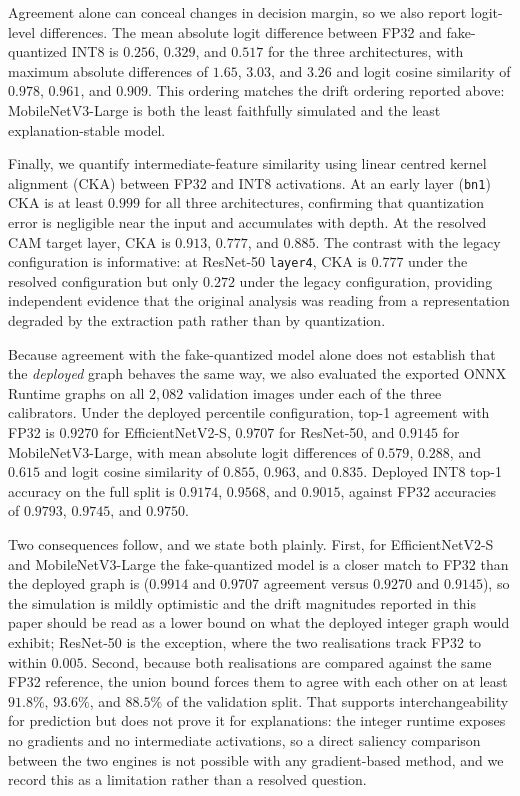 \documentclass[fleqn,10pt]{wlscirep}
\begin{document}
Agreement alone can conceal changes in decision margin, so we also report logit-level differences. The mean absolute logit difference between FP32 and fake-quantized INT8 is $0.256$, $0.329$, and $0.517$ for the three architectures, with maximum absolute differences of $1.65$, $3.03$, and $3.26$ and logit cosine similarity of $0.978$, $0.961$, and $0.909$. This ordering matches the drift ordering reported above: MobileNetV3-Large is both the least faithfully simulated and the least explanation-stable model.

Finally, we quantify intermediate-feature similarity using linear centred kernel alignment (CKA) between FP32 and INT8 activations. At an early layer (\texttt{bn1}) CKA is at least $0.999$ for all three architectures, confirming that quantization error is negligible near the input and accumulates with depth. At the resolved CAM target layer, CKA is $0.913$, $0.777$, and $0.885$. The contrast with the legacy configuration is informative: at ResNet-50 \texttt{layer4}, CKA is $0.777$ under the resolved configuration but only $0.272$ under the legacy configuration, providing independent evidence that the original analysis was reading from a representation degraded by the extraction path rather than by quantization.

Because agreement with the fake-quantized model alone does not establish that the \emph{deployed} graph behaves the same way, we also evaluated the exported ONNX Runtime graphs on all $2{,}082$ validation images under each of the three calibrators. Under the deployed percentile configuration, top-1 agreement with FP32 is $0.9270$ for EfficientNetV2-S, $0.9707$ for ResNet-50, and $0.9145$ for MobileNetV3-Large, with mean absolute logit differences of $0.579$, $0.288$, and $0.615$ and logit cosine similarity of $0.855$, $0.963$, and $0.835$. Deployed INT8 top-1 accuracy on the full split is $0.9174$, $0.9568$, and $0.9015$, against FP32 accuracies of $0.9793$, $0.9745$, and $0.9750$.

Two consequences follow, and we state both plainly. First, for EfficientNetV2-S and MobileNetV3-Large the fake-quantized model is a closer match to FP32 than the deployed graph is ($0.9914$ and $0.9707$ agreement versus $0.9270$ and $0.9145$), so the simulation is mildly optimistic and the drift magnitudes reported in this paper should be read as a lower bound on what the deployed integer graph would exhibit; ResNet-50 is the exception, where the two realisations track FP32 to within $0.005$. Second, because both realisations are compared against the same FP32 reference, the union bound forces them to agree with each other on at least $91.8\%$, $93.6\%$, and $88.5\%$ of the validation split. That supports interchangeability for prediction but does not prove it for explanations: the integer runtime exposes no gradients and no intermediate activations, so a direct saliency comparison between the two engines is not possible with any gradient-based method, and we record this as a limitation rather than a resolved question.
\end{document}

